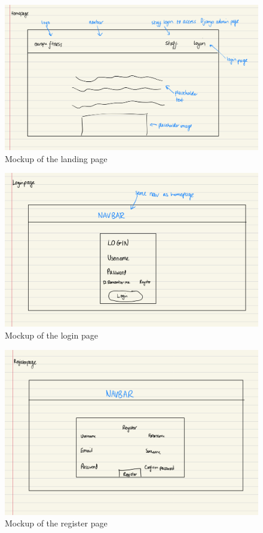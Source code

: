\documentclass{article}
\begin{document}
\begin{figure}
  \centering
  \includegraphics[width=1\textwidth]{img/Figure 13.jpeg}
  \caption{Mockup of the landing page}
\end{figure}

\begin{figure}
  \centering
  \includegraphics[width=1\textwidth]{img/Figure 14.jpeg}
  \caption{Mockup of the login page}
\end{figure}

\begin{figure}
  \centering
  \includegraphics[width=1\textwidth]{img/Figure 15.jpeg}
  \caption{Mockup of the register page}
\end{figure}
\end{document}
